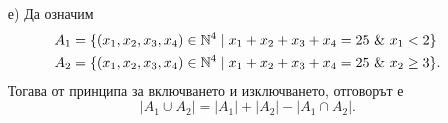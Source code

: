 \begin{solution}
\begin{enumerate}[a)]
  \item[е)]
    Да означим
    \begin{align*}
      A_1 & = \{(x_1,x_2,x_3,x_4)\in\mathbb{N}^4 \mid x_1+x_2+x_3+x_4 = 25\ \&\ x_1 < 2\}\\
      A_2 & = \{(x_1,x_2,x_3,x_4)\in\mathbb{N}^4 \mid x_1+x_2+x_3+x_4 = 25\ \&\ x_2 \geq 3\}.
    \end{align*}
    Тогава от принципа за включването и изключването, отговорът е 
    \[|A_1 \cup A_2| = |A_1| + |A_2| - |A_1 \cap A_2|.\]
  \end{enumerate}
\end{solution}



